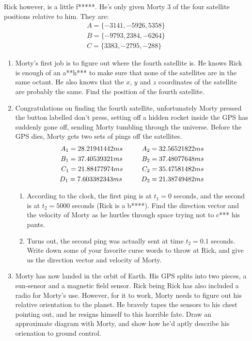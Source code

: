 \documentclass[a4paper, 12pt]{exam}
\newcommand{\cuspac}{\hspace*{1cm}}
\begin{document}
	Rick however, is a little f*****. He's only given Morty 3 of the four satellite positions relative to him. They are:
	\begin{align*}
		A = \{-3141, -5926, 5358\}\\
		B = \{-9793, 2384, -6264\}\\
		C = \{3383, -2795, -288\}
	\end{align*}
	\begin{enumerate}[label = (\alph*)]
		\item Morty's first job is to figure out where the fourth satellite is. He knows Rick is enough of an a**h*** to make sure that none of the satellites are in the same octant. He also knows that the $x$, $y$ and $z$ coordinates of the satellite are probably the same. Find the position of the fourth satellite.
		\item Congratulations on finding the fourth satellite, unfortunately Morty pressed the button labelled don't press, setting off a hidden rocket inside the GPS has suddenly gone off, sending Morty tumbling through the universe. Before the GPS dies, Morty gets two sets of pings off the satellites.
		\begin{align*}
			A_1 = 28.21941442 ms \cuspac A_2 = 32.56521822 ms\\
			B_1 = 37.40539321 ms \cuspac B_2 = 37.48077648 ms\\
			C_1 = 21.88477974 ms \cuspac C_2 = 35.47581482 ms\\
			D_1 = 7.603382343 ms \cuspac D_2 = 21.38749482 ms
		\end{align*}
		\begin{enumerate}[label = (\roman*)]
			\item According to the clock, the first ping is at $t_1 = 0$ seconds, and the second is at $t_2 = 5000$ seconds (Rick is a b****). Find the direction vector and the velocity of Morty as he hurtles through space trying not to c*** his pants.
			\item Turns out, the second ping was actually sent at time $t_2 = 0.1$ seconds. Write down some of your favorite curse words to throw at Rick, and give us the direction vector and velocity of Morty.
		\end{enumerate}
		\item Morty has now landed in the orbit of Earth. His GPS splits into two pieces, a sun-sensor and a magnetic field sensor. Rick being Rick has also included a radio for Morty's use. However, for it to work, Morty needs to figure out his relative orientation to the planet. He bravely tapes the sensors to his chest pointing out, and he resigns himself to this horrible fate. Draw an approximate diagram with Morty, and show how he'd aptly describe his orienation to ground control.
	\end{enumerate}
\end{document}
